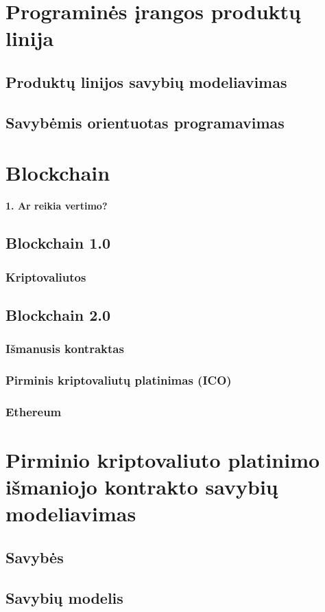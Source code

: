 \documentclass{VUMIFInfKursinis}
\begin{document}
\section{Programinės įrangos produktų linija}
\subsection{Produktų linijos savybių modeliavimas}
\subsection{Savybėmis orientuotas programavimas}
\section{Blockchain}
\textbf{1. Ar reikia vertimo?}
\subsection{Blockchain 1.0}
\subsubsection{Kriptovaliutos}
\subsection{Blockchain 2.0}
\subsubsection{Išmanusis kontraktas}
\subsubsection{Pirminis kriptovaliutų platinimas (ICO)}
\subsubsection{Ethereum}
\section{Pirminio kriptovaliuto platinimo išmaniojo kontrakto savybių modeliavimas}
\subsection{Savybės}
\subsection{Savybių modelis}
\end{document}

